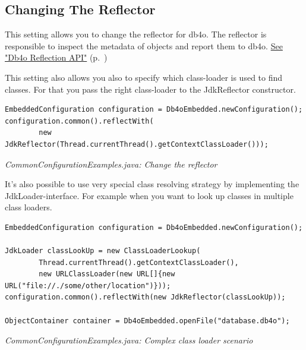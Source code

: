 \subsection{Changing The Reflector}
\label{ref:configuration-common-reflector}

This setting allows you to change the reflector for db4o. The reflector is responsible to inspect the metadata of objects and report them to db4o. \hyperref[ref:advanced-topics-db4o-reflection-api]{See "Db4o Reflection API"} (p.~\pageref{ref:advanced-topics-db4o-reflection-api})

This setting also allows you also to specify which class-loader is used to find classes. For that you pass the right class-loader to the JdkReflector constructor.\newline{}

\begin{lstlisting}
EmbeddedConfiguration configuration = Db4oEmbedded.newConfiguration();
configuration.common().reflectWith(
        new JdkReflector(Thread.currentThread().getContextClassLoader()));
\end{lstlisting}

{\small\itshape CommonConfigurationExamples.java: Change the reflector\par}
\medskip

It's also possible to use very special class resolving strategy by implementing the JdkLoader-interface. For example when you want to look up classes in multiple class loaders.

\begin{lstlisting}
EmbeddedConfiguration configuration = Db4oEmbedded.newConfiguration();

JdkLoader classLookUp = new ClassLoaderLookup(
        Thread.currentThread().getContextClassLoader(),
        new URLClassLoader(new URL[]{new URL("file://./some/other/location")}));
configuration.common().reflectWith(new JdkReflector(classLookUp));

ObjectContainer container = Db4oEmbedded.openFile("database.db4o");
\end{lstlisting}

{\small\itshape CommonConfigurationExamples.java: Complex class loader scenario\par}
\medskip

